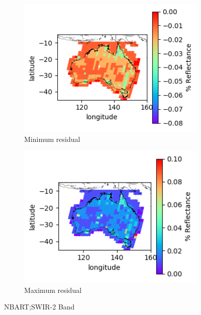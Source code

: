 \documentclass[a4paper]{article}
\begin{document}
      \begin{figure}[h!]
        \centering
          \begin{subfigure}[l]{.4\linewidth}
            \hspace{-32mm}
            \includegraphics[scale=0.9]{plots/nbart/nbart_swir_2-MinResidual.png}
            \caption{Minimum residual}
          \end{subfigure}
%
          \begin{subfigure}[r]{.4\linewidth}
            \includegraphics[scale=0.9]{plots/nbart/nbart_swir_2-MaxResidual.png}
            \caption{Maximum residual}
          \end{subfigure}
        \caption{NBART;\@ SWIR-2 Band}\label{figure:13}
      \end{figure}
\end{document}
